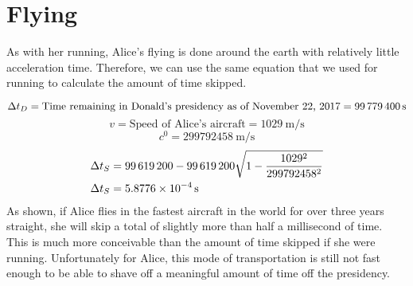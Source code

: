 \section{Flying}
	As with her running, Alice's flying is done around the earth with relatively little acceleration time. Therefore, we can use the same equation that we used for running to calculate the amount of time skipped.

	\[\mathrm{\Delta} t_D = \text{Time remaining in Donald's presidency as of November 22, 2017} = \SI{99779400}{\second}\]
	\[v = \text{Speed of Alice's aircraft} = \SI{1029}{\metre/\second}\]
	\[\si{\clight} = \SI{299792458}{\metre/\second}\]
	\begin{align*}
		\mathrm{\Delta} t_S &= \num{99619200} - \num{99619200} \sqrt {1- \frac{1029^2}{299792458^2}}\\
		\mathrm{\Delta} t_S &= \SI{5.8776e-4}{\second}
	\end{align*}
	As shown, if Alice flies in the fastest aircraft in the world for over three years straight, she will skip a total of slightly more than half a millisecond of time. This is much more conceivable than the amount of time skipped if she were running. Unfortunately for Alice, this mode of transportation is still not fast enough to be able to shave off a meaningful amount of time off the presidency.
